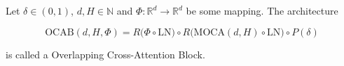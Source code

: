 \begin{definition}
    \label{def:oca_block}
    Let $\delta \in (0, 1)$, $d, H \in \mathbb N$ and $\Phi: \mathbb{R}^d \to \mathbb{R}^d$ be some mapping.
    The architecture 

        \begin{equation*}
            \text{OCAB}(d, H, \Phi) = R \big( \Phi \circ \text{LN} \big) \circ R \big( \text{MOCA}(d, H) \circ \text{LN} \big) \circ P(\delta)
        \end{equation*}

    \noindent is called a Overlapping Cross-Attention Block.
\end{definition}